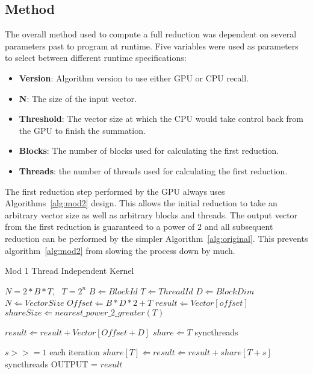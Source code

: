 \documentclass[conference]{IEEEtran}
\begin{document}
\subsection{Method}
The overall method used to compute a full reduction was dependent on several parameters past to program at runtime. Five variables were used as parameters to select between different runtime specifications:
\begin{itemize}
  \item \textbf{Version}: Algorithm version to use either GPU or CPU recall.
  \item \textbf{N}: The size of the input vector.
  \item \textbf{Threshold}: The vector size at which the CPU would take control back from the GPU to finish the summation.
  \item \textbf{Blocks}: The number of blocks used for calculating the first reduction.
  \item \textbf{Threads}: the number of threads used for calculating the first reduction.
\end{itemize}
The first reduction step performed by the GPU always uses Algorithms~\ref{alg:mod2} design. This allows the initial reduction to take an arbitrary vector size as well as arbitrary blocks and threads. The output vector from the first reduction is guaranteed to a power of 2 and all subsequent reduction can be performed by the simpler Algorithm~\ref{alg:original}. This prevents algorithm~\ref{alg:mod2} from slowing the process down by much.


\begin{algorithm}
  \caption{Mod 1 Thread Independent Kernel}
  \label{alg:mod1}
  \begin{algorithmic}
    \REQUIRE $N=2*B*T$,~ $T=2^n$
    \STATE $B \Leftarrow BlockId$
    \STATE $T \Leftarrow ThreadId$
    \STATE $D \Leftarrow BlockDim$
    \STATE $N \Leftarrow Vector Size$
    \STATE $Offset \Leftarrow B * D * 2 + T$
    \STATE $result \Leftarrow Vector[offset]$
    \STATE $shareSize \Leftarrow nearest\_power\_2\_greater(T)$
    
        \STATE $result \Leftarrow result + Vector[Offset + D]$
    \ENDIF
    \STATE $share \Leftarrow T$
    \STATE syncthreads
    
    \STATE $s >>= 1$ each iteration
            \STATE $share[T] \Leftarrow result \Leftarrow result + share[T + s]$
        \ENDIF
        \STATE syncthreads
    \ENDFOR
      \STATE OUTPUT = $result$
    \ENDIF
  \end{algorithmic}
\end{algorithm}
\end{document}
